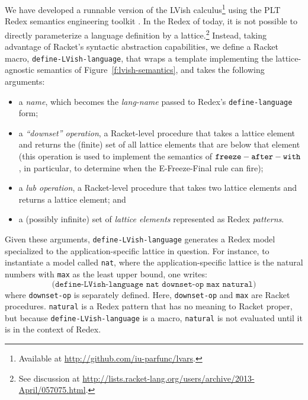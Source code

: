 We have developed a runnable version of the LVish calculus\footnote{Available at \url{http://github.com/iu-parfunc/lvars}.} using the
PLT Redex semantics engineering toolkit \cite{redex-book}.
In the Redex of today, it is not possible to directly parameterize a
language definition by a lattice.\footnote{See discussion at
  \url{http://lists.racket-lang.org/users/archive/2013-April/057075.html}.}
Instead, taking advantage of Racket's syntactic abstraction capabilities,
we define a Racket macro, \texttt{define-LVish-language},
that wraps a template implementing the lattice-agnostic semantics of 
Figure~\ref{f:lvish-semantics}, and takes the following arguments:
\begin{itemize}
\item a \emph{name}, which becomes the \emph{lang-name} passed to
  Redex's \texttt{define-language} form;
\item a \emph{``downset'' operation}, a Racket-level procedure that
  takes a lattice element and returns the (finite) set of all lattice
  elements that are below that element (this operation is used to
  implement the semantics of ${\mbox{\texttt{freeze}}-\mbox{\texttt{after}}-\mbox{\texttt{with}}}$, in particular,
  to determine when the {\sc E-Freeze-Final} rule can fire);
\item a \emph{lub operation}, a Racket-level procedure that takes two
  lattice elements and returns a lattice element; and
\item a (possibly infinite) set of \emph{lattice elements} represented as
  Redex \emph{patterns}.
\end{itemize}
Given these arguments, \texttt{define-LVish-language} generates a
Redex model specialized to the application-specific lattice in question. For
instance, to instantiate a model called \texttt{nat}, where
the application-specific lattice is the natural numbers with \texttt{max} as
the least upper bound, one writes:
\[
\texttt{(define-LVish-language nat downset-op max natural)}
\]
where \texttt{downset-op} is separately defined.  
Here,
\texttt{downset-op} and \texttt{max} are Racket procedures.
\texttt{natural} is a Redex pattern that has no meaning to Racket proper, but
because \texttt{define-LVish-language} is a macro, \texttt{natural} is
not evaluated until it is in the context of Redex.
